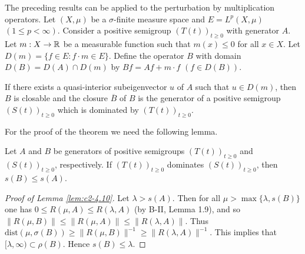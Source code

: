 The preceding results can be applied to the perturbation by multiplication operators. 
Let $(X,\mu)$ be a $\sigma$-finite measure space and $E = L^{p}(X,\mu)$ $(1 \leq p < \infty)$. 
Consider a positive semigroup $(T(t))_{t \geq 0}$ with generator $A$. 
Let $m : X \to \mathbb{R}$ be a measurable function such that $m(x) \leq 0$ for all $x \in X$. 
Let $D(m) = \{f \in E : f \cdot m \in E\}$. 
Define the operator $B$ with domain $D(B) = D(A) \cap D(m)$ by $Bf = Af + m \cdot f$ $(f \in D(B))$.
\begin{theorem}\label{thm:c2-4.9}
If there exists a quasi-interior subeigenvector $u$ of $A$
such that $u \in D(m)$, then $B$ is closable and the closure $\overline{B}$ of $B$ is the generator of a positive semigroup $(S(t))_{t \geq 0}$ which is dominated by $(T(t))_{t \geq 0}$.
\end{theorem}

For the proof of the theorem we need the following lemma.

\begin{lemma}\label{lem:c2-4.10}
Let $A$ and $B$ be generators of positive semigroups
$(T(t))_{t \geq 0}$ and $(S(t))_{t \geq 0}$, respectively.
If $(T(t))_{t \geq 0}$ dominates
$(S(t))_{t \geq 0}$, then $s(B) \leq s(A)$.
\end{lemma}

\begin{proof}[Proof of Lemma \ref{lem:c2-4.10}]
Let $\lambda > s(A)$.
Then for all $\mu > \max \{\lambda,s(B)\}$ one has $0 \leq R(\mu,A) \leq R(\lambda,A)$ 
(by B-II, Lemma 1.9), and so $\|R(\mu,B)\| \leq  \|R(\mu,A)\| \leq \|R(\lambda,A)\|$.
Thus $\text{dist}(\mu,\sigma(B)) \geq \|R(\mu,B)\|^{-1} \geq \|R(\lambda,A)\|^{-1}$.
This implies that $[\lambda,\infty) \subset \rho(B)$.
Hence $s(B) \leq \lambda$.
\end{proof}

